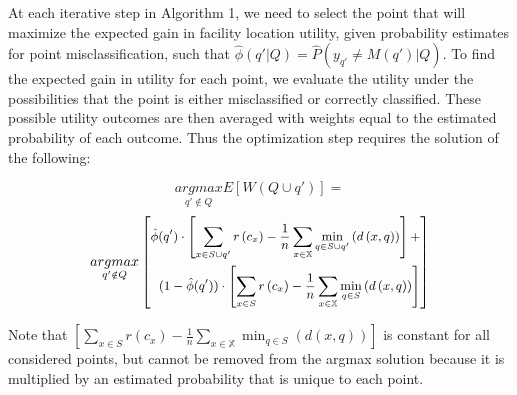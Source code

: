 \documentclass[letterpaper]{article} %
\begin{document}
At each iterative step in Algorithm 1, we need to select the point that will maximize the expected gain in facility location utility, given probability estimates for point misclassification, such that  $\hat{\phi}(q' | Q) = \hat{P}(y_{q'} \ne M(q' ) |  Q )$. To find the expected gain in utility for each point, we evaluate the utility under the possibilities that the point is either misclassified or correctly classified. These possible utility outcomes are then averaged with weights equal to the estimated probability of each outcome. Thus the optimization step requires the solution of the following:

$$\underset{q' \notin Q}{argmax} E[W(Q \cup q')] = $$
\begin{equation*}
\small
\underset{q' \notin Q}{argmax} \left[\begin{split}
\hat{\phi}(q') \cdot \left[\sum_{x \in S \cup q'} r \left(c_x\right) - \frac{1}{n} \sum_{x \in \mathbb{X}} \min_{q \in S \cup q'}\left(d\left(x,q\right)\right) \right] + \\ 
(1-\hat{\phi}(q')) \cdot \left[\sum_{x \in S} r \left(c_x\right) - \frac{1}{n} \sum_{x \in \mathbb{X}} \min_{q \in S}\left(d\left(x,q\right)\right)\right]  
\end{split}\right]
\end{equation*}
\normalsize

Note that $\left[\sum_{x \in S} r \left(c_x\right) - \frac{1}{n} \sum_{x \in \mathbb{X}} \min_{q \in S}\left(d\left(x,q\right)\right)\right]$ is constant for all considered points, but cannot be removed from the argmax solution because it is multiplied by an estimated probability that is unique to each point. 
\end{document}
